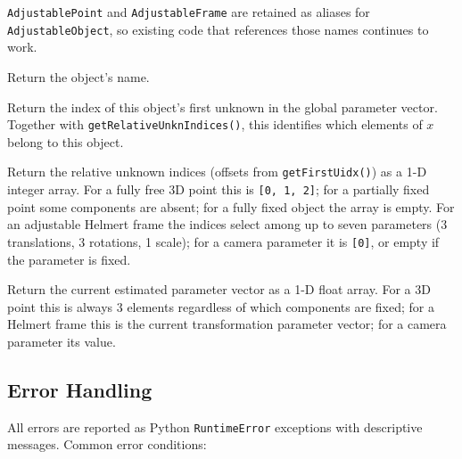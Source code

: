 \documentclass[a4paper,11pt]{article}
\newcommand{\code}[1]{\texttt{#1}}
\begin{document}
\code{AdjustablePoint} and \code{AdjustableFrame} are retained as
aliases for \code{AdjustableObject}, so existing code that references
those names continues to work.

\begin{description}[style=nextline, leftmargin=1.5em]
\item[\code{getName() -> str}]
    Return the object's name.

\item[\code{getFirstUidx() -> int}]
    Return the index of this object's first unknown in the global
    parameter vector. Together with \code{getRelativeUnknIndices()},
    this identifies which elements of $x$ belong to this object.

\item[\code{getRelativeUnknIndices() -> numpy.ndarray}]
    Return the relative unknown indices (offsets from
    \code{getFirstUidx()}) as a 1-D integer array.
    For a fully free 3D point this is \code{[0, 1, 2]}; for a partially
    fixed point some components are absent; for a fully fixed object
    the array is empty.
    For an adjustable Helmert frame the indices select among up to
    seven parameters (3 translations, 3 rotations, 1 scale); for a
    camera parameter it is \code{[0]}, or empty if the parameter is fixed.

\item[\code{getEstVector() -> numpy.ndarray}]
    Return the current estimated parameter vector as a 1-D float array.
    For a 3D point this is always 3 elements regardless of which
    components are fixed; for a Helmert frame this is the current
    transformation parameter vector; for a camera parameter its value.
\end{description}

\subsection{Error Handling}
\label{sec:errors}

All errors are reported as Python \code{RuntimeError} exceptions with
descriptive messages. Common error conditions:
\end{document}
